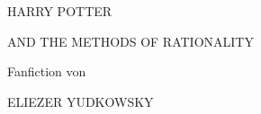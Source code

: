 \begin{center}
\thispagestyle{empty}
\vspace*{0.5cm}
%

\vspace*{-1.5cm}
{\hpfont
\Huge\MakeUppercase{Harry Potter}\vspace*{0.5cm}

\Large\MakeUppercase{and the Methods of Rationality} %
\vspace*{1\baselineskip}




\vspace*{7.0cm}

\Large Fanfiction von \vspace*{.10cm}

\huge \MakeUppercase{Eliezer Yudkowsky}%

\small

}
\end{center}
